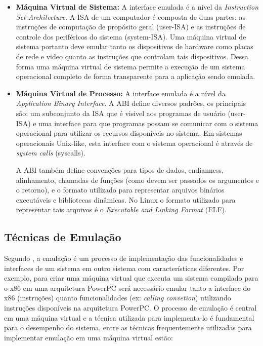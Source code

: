\documentclass[11pt,twoside]{article}
\begin{document}
\begin{itemize}
	\item \textbf{Máquina Virtual de Sistema:} A interface emulada é a nível da \emph{Instruction Set Architecture}. A ISA de
	um computador é composta de duas partes: as instruções de computação de propósito geral (user-ISA) e as instruções de 
	controle dos periféricos do sistema (system-ISA). Uma máquina virtual de sistema portanto deve emular tanto os dispositivos
	de hardware como placas de rede e video quanto as instruções que controlam tais dispositivos. Dessa forma uma máquina
	virtual de sistema permite a execução de um sistema operacional completo de forma transparente para a aplicação sendo
	emulada. 

	\item \textbf{Máquina Virtual de Processo:} A interface emulada é a nível da \emph{Application Binary Interface}. A ABI  
	define diversos padrões, os principais são: um subconjunto da ISA que é visivel aos programas de usuário (user-ISA) e uma 
	interface para que programas possam se comunicar com o sistema operacional para utilizar os recursos disponíveis no sistema. 
	Em sistemas operacionais Unix-like, esta interface com o sistema operacional é através de \emph{system calls} (syscalls). 

	A ABI também define convenções para tipos de dados, endianness, alinhamento, chamadas de funções (como devem ser passados 
	os argumentos e o retorno), e o formato utilizado para representar arquivos binários executáveis e bibliotecas dinâmicas.
	No Linux o formato utilizado para representar tais arquivos é o \emph{Executable and Linking Format} (ELF).
\end{itemize}







\subsection{Técnicas de Emulação} \label{emulacao}

Segundo \cite{Smith2005}, a emulação é um processo de implementação das funcionalidades e interfaces de 
um sistema em outro sistema com características diferentes. Por exemplo, para criar uma máquina virtual
que executa um sistema compilado para o x86 em uma arquitetura PowerPC será necessário emular
tanto a interface do x86 (instruções) quanto funcionalidades (ex: \emph{calling convetion}) utilizando
instruções disponíveis na arquitetura PowerPC. O processo de emulação é central em uma máquina virtual
e a técnica utilizada para implementa-lo é fundamental para o desempenho do sistema, entre as técnicas 
frequentemente utilizadas para implementar emulação em uma máquina virtual estão: 
\end{document}
